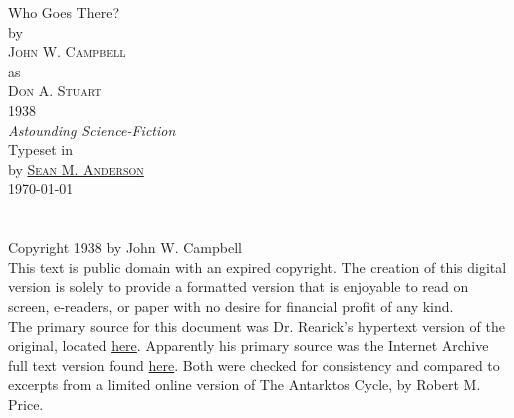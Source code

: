 \documentclass[letterpaper,openany,12pt]{memoir}		%
\begin{document}
\frontmatter
\pagestyle{empty}
\begin{titlingpage}
\begin{center}
\vspace*{\fill}
{\maintitle Who Goes There?}\\\vspace{25pt}
{\large by}\\\vspace{25pt}
{\Large\textsc{John W. Campbell}}\\\vspace{5pt}
{\large as}\\\vspace{6pt}
{\Large\textsc{Don A. Stuart}}\\\vspace{25pt}
{\Large 1938\\\vspace{6pt}\emph{Astounding Science-Fiction}}\\
\vfill
Typeset in \XeLaTeX\\by {\href{https://github.com/roguephysicist/who_goes_there}
                        {\textsc{Sean M. Anderson}}}\\
\today
\vspace*{\fill}
\end{center}
\end{titlingpage}
\chapter*{}
\vspace*{\fill}
Copyright \textcopyright{} 1938 by John W. Campbell\\

\noindent This text is public domain with an expired copyright. The creation of
this digital version is solely to provide a formatted version that is enjoyable
to read on screen, e-readers, or paper with no desire for financial profit of
any kind.\\

\noindent The primary source for this document was Dr. Rearick's hypertext
version of the original, located
\href{http://nzr.mvnu.edu/faculty/trearick/english/rearick/readings/manuscri/Who%20Goes%20There/Who%20Goes%20There%20Index.htm}{here}. 
Apparently his primary source was the Internet Archive full text version found
\href{http://www.archive.org/stream/WhoGoesThere_414/WhoGoesThere.txt}{here}.
Both were checked for consistency and compared to excerpts from a limited online
version of The Antarktos Cycle, by Robert M. Price.
\end{document}
